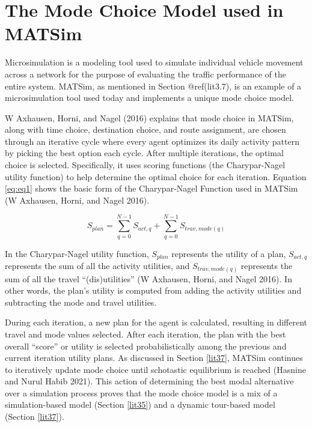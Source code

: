\documentclass[12pt, oneside, openright]{byuthesis}
\begin{document}
\hypertarget{lit6}{%
\section{The Mode Choice Model used in MATSim}\label{lit6}}

Microsimulation is a modeling tool used to simulate individual vehicle movement across a network for the purpose of evaluating the traffic performance of the entire system. MATSim, as mentioned in Section @ref(lit3.7), is an example of a microsimulation tool used today and implements a unique mode choice model.

W Axhausen, Horni, and Nagel (2016) explains that mode choice in MATSim, along with time choice, destination choice, and route assignment, are chosen through an iterative cycle where every agent optimizes its daily activity pattern by picking the best option each cycle. After multiple iterations, the optimal choice is selected. Specifically, it uses scoring functions (the Charypar-Nagel utility function) to help determine the optimal choice for each iteration. Equation \eqref{eq:eq1} shows the basic form of the Charypar-Nagel Function used in MATSim (W Axhausen, Horni, and Nagel 2016).

\begin{equation} 
  S_{plan} = \sum_{q=0}^{N-1} S_{act,q} + \sum_{q=0}^{N-1} S_{trav,mode(q)}
  \label{eq:eq1}
\end{equation}

In the Charypar-Nagel utility function, \(S_{plan}\) represents the utility of a plan, \(S_{act,q}\) represents the sum of all the activity utilities, and \(S_{trav,mode(q)}\) represents the sum of all the travel ``(dis)utilities'' (W Axhausen, Horni, and Nagel 2016). In other words, the plan's utility is computed from adding the activity utilities and subtracting the mode and travel utilities.

During each iteration, a new plan for the agent is calculated, resulting in different travel and mode values selected. After each iteration, the plan with the best overall ``score'' or utility is selected probabilistically among the previous and current iteration utility plans. As discussed in Section \ref{lit37}, MATSim continues to iteratively update mode choice until schotastic equilibrium is reached (Hasnine and Nurul Habib 2021). This action of determining the best modal alternative over a simulation process proves that the mode choice model is a mix of a simulation-based model (Section \ref{lit35}) and a dynamic tour-based model (Section \ref{lit37}).
\end{document}
